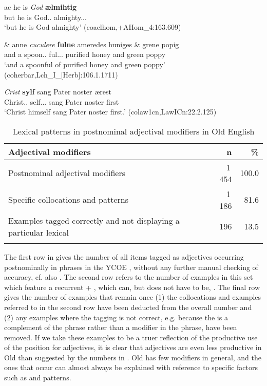 \documentclass[output=paper,colorlinks,citecolor=brown,draft]{langscibook}
\begin{document}
\ea\label{OELexPat}
\gll ac he is \textit{God} \textbf{ælmihtig}\\
	but he is God.\NOM.\SG{} almighty.\NOM.\SG.\STR{}\\
\glt ‘but he is God almighty’ (coaelhom,+AHom\_4:163.609)
\z

\ea\label{OELexPat2}
\gll \& anne \textit{cuculere} \textbf{fulne} ameredes huniges \& grene popig\\
	and a spoon.\ACC.\SG{} ful.\ACC.\SG.\STR{} purified honey and green poppy\\
\glt ‘and a spoonful of purified honey and green poppy' (coherbar,Lch\_I\_[Herb]:106.1.1711)
\z

\ea\label{OELexPat3}
\gll \textit{Crist} \textbf{sylf} sang Pater noster ærest\\
	Christ.\NOM.\SG{} self.\NOM.\SG.\STR{} sang Pater noster first\\
\glt ‘Christ himself sang Pater noster first.’ (colaw1cn,LawICn:22.2.125)
\z

\begin{table}
\caption{Lexical patterns in postnominal adjectival modifiers in Old English}
\label{tabOELexDiff}
 \begin{tabularx}{.8\textwidth}{Qrr}
  \lsptoprule
  Adjectival modifiers & n & \%\\\midrule
 Postnominal adjectival modifiers & 1\,454 & 100.0\\
 \tablevspace
 Specific collocations and  patterns & 1\,186 & 81.6\\
 \tablevspace
 Examples tagged correctly and not displaying
a particular lexical  & 196 & 13.5 \\
  \lspbottomrule
 \end{tabularx}
\end{table}

The first row in  gives the number of all items tagged as adjectives occurring postnominally in  phrases in the YCOE , without any further manual checking of accuracy, cf. also . The second row refers to the number of examples in this set which feature a recurrent  +  , which can, but does not have to be, . The final row gives the number of examples that remain once (1) the collocations and  examples referred to in the second row have been deducted from the overall number and (2) any examples where the tagging is not correct, e.g. because the  is a complement of the  phrase rather than a modifier in the  phrase, have been removed. If we take these examples to be a truer reflection of the productive use of the  position for adjectives, it is clear that  adjectives are even less productive in Old  than suggested by the numbers in . Old  has few  modifiers in general, and the ones that occur can almost always be explained with reference to specific factors such as  and  patterns. 
\end{document}
